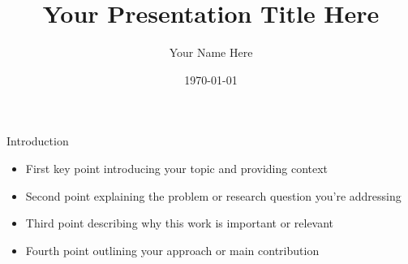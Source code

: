 \documentclass[
    10pt,
    aspectratio=169,
]{beamer}
\title[Short Title]{Your Presentation Title Here}
\author[Initials]{Your Name Here}
\date{\today}
\institute[Institution]{Your Department or Institute \\
Your University Name }
\begin{document}
\section{}
\begin{frame}
	\titlepage %
\end{frame}







\begin{frame}{Introduction}
\begin{itemize}
    \item First key point introducing your topic and providing context
    \item Second point explaining the problem or research question you're addressing
    \item Third point describing why this work is important or relevant
    \item Fourth point outlining your approach or main contribution
\end{itemize}
\end{frame}
\end{document}
